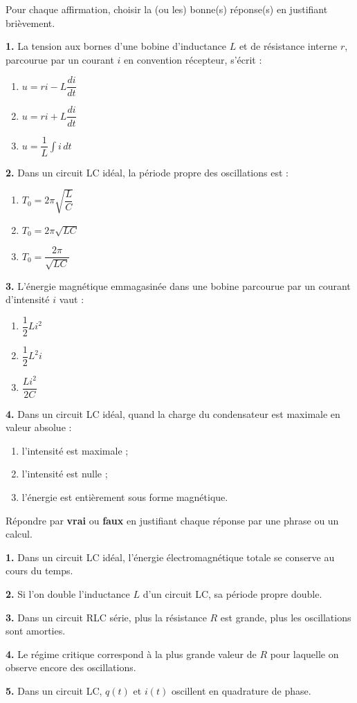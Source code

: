\documentclass[11pt]{article}
\begin{document}
\begin{exercice}
Pour chaque affirmation, choisir la (ou les) bonne(s) réponse(s) en justifiant brièvement.

\textbf{1.} La tension aux bornes d'une bobine d'inductance $L$ et de résistance interne $r$, parcourue par un courant $i$ en convention récepteur, s'écrit :
\begin{enumerate}[label=\alph*)]
\item $u = ri - L\dfrac{di}{dt}$
\item $u = ri + L\dfrac{di}{dt}$
\item $u = \dfrac{1}{L}\displaystyle\int i\,dt$
\end{enumerate}

\textbf{2.} Dans un circuit LC idéal, la période propre des oscillations est :
\begin{enumerate}[label=\alph*)]
\item $T_0 = 2\pi\sqrt{\dfrac{L}{C}}$
\item $T_0 = 2\pi\sqrt{LC}$
\item $T_0 = \dfrac{2\pi}{\sqrt{LC}}$
\end{enumerate}

\textbf{3.} L'énergie magnétique emmagasinée dans une bobine parcourue par un courant d'intensité $i$ vaut :
\begin{enumerate}[label=\alph*)]
\item $\dfrac{1}{2}Li^2$
\item $\dfrac{1}{2}L^2i$
\item $\dfrac{Li^2}{2C}$
\end{enumerate}

\textbf{4.} Dans un circuit LC idéal, quand la charge du condensateur est maximale en valeur absolue :
\begin{enumerate}[label=\alph*)]
\item l'intensité est maximale ;
\item l'intensité est nulle ;
\item l'énergie est entièrement sous forme magnétique.
\end{enumerate}
\end{exercice}

\begin{exercice}
Répondre par \textbf{vrai} ou \textbf{faux} en justifiant chaque réponse par une phrase ou un calcul.

\textbf{1.} Dans un circuit LC idéal, l'énergie électromagnétique totale se conserve au cours du temps.

\textbf{2.} Si l'on double l'inductance $L$ d'un circuit LC, sa période propre double.

\textbf{3.} Dans un circuit RLC série, plus la résistance $R$ est grande, plus les oscillations sont amorties.

\textbf{4.} Le régime critique correspond à la plus grande valeur de $R$ pour laquelle on observe encore des oscillations.

\textbf{5.} Dans un circuit LC, $q(t)$ et $i(t)$ oscillent en quadrature de phase.
\end{exercice}
\end{document}
